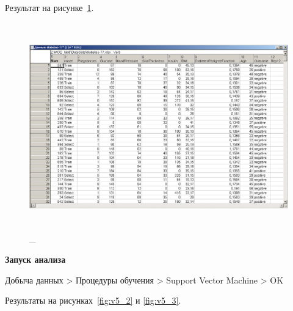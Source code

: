 Результат на рисунке~\ref{fig:v5_1}.

\begin{figure}[!h]
  \centering

  \includegraphics[height=9cm]
  {inc/v5_1.PNG}

  \caption{\_}

  \label{fig:v5_1}
\end{figure}

\newpage

\begin{center}
  \textbf{Запуск анализа}
\end{center}

Добыча данных > Процедуры обучения > Support Vector Machine > OK

Результаты на рисунках~\ref{fig:v5_2} и \ref{fig:v5_3}.

